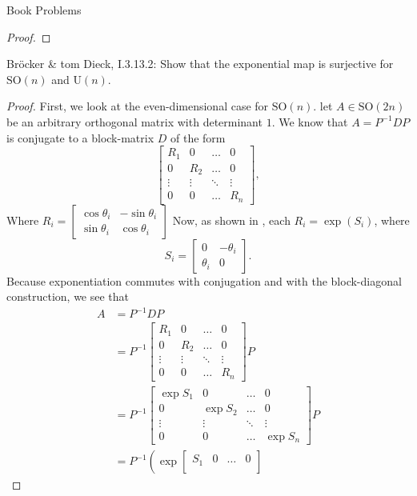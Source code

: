\documentclass[12pt]{article}
\theoremstyle{definition}
\newenvironment{problem}[2][Problem]{\begin{trivlist}
\item[\hskip \labelsep {\bfseries #1}\hskip \labelsep {\bfseries #2.}]}{\end{trivlist}}
\begin{document}
\begin{section}{Book Problems}
\begin{proof}
\end{proof}
\begin{problem}{6}
	Br\"ocker \& tom Dieck, I.3.13.2: Show that the exponential map is surjective for $\text{SO}(n)$ and $\text{U}(n)$.	
\end{problem}
\begin{proof}
	First, we look at the even-dimensional case for $\text{SO}(n)$. let $A \in \text{SO}(2n)$ be an arbitrary orthogonal matrix with determinant $1$. We know that $A = P^{-1}DP$ is conjugate to a block-matrix $D$ of the form 
	\[ \begin{bmatrix}R_1 & 0 & \dots & 0 \\
	  0 & R_2 & \dots & 0 \\
	  \vdots & \vdots & \ddots & \vdots \\
	  0 & 0 &   \dots & R_n \end{bmatrix}, \]
	  Where $R_i = \begin{bmatrix}
		  \cos \theta_i & - \sin \theta_i \\
		  \sin \theta_i & \cos \theta_i
	  \end{bmatrix}$
	  Now, as shown in \cite{lax}, each $R_i = \exp(S_i)$, where
	  \[S_i = \begin{bmatrix}
		  0 & -\theta_i \\
		  \theta_i & 0
  \end{bmatrix}.\]
  Because exponentiation commutes with conjugation and with the block-diagonal construction, we see that
  \begin{align*}
	  A &= P^{-1}DP \\
	  &= P^{-1}\begin{bmatrix}
		  R_1 & 0 & \dots & 0\\
		  0 & R_2 & \dots & 0\\
		  \vdots & \vdots & \ddots & \vdots \\
		  0 & 0 & \dots & R_n
	  \end{bmatrix} P\\
	  &= P^{-1}\begin{bmatrix}
		  \exp S_1 & 0 & \dots & 0\\
		  0 & \exp S_2 & \dots & 0 \\
		  \vdots & \vdots & \ddots & \vdots \\
		  0 & 0 & \dots & \exp S_n
	  \end{bmatrix}P\\
	  &= P^{-1}\left (\exp \begin{bmatrix}
		  S_1 & 0 & \dots & 0\\

\end{bmatrix}
\end{align*}
\end{proof}
\end{section}
\end{document}

